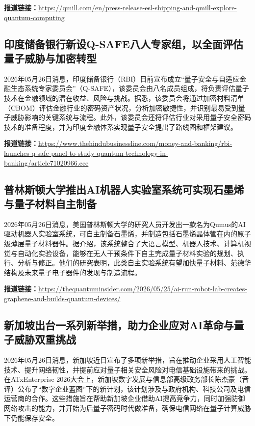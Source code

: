 \documentclass[12pt,a4paper]{ctexart}
\begin{document}
\noindent\textbf{报道链接：}\url{https://qmill.com/en/press-release-esl-shipping-and-qmill-explore-quantum-computing}

\subsection{ 印度储备银行新设Q-SAFE八人专家组，以全面评估量子威胁与加密转型 }

2026年05月26日消息，印度储备银行（RBI）日前宣布成立“量子安全与自适应金融生态系统专家委员会”（Q-SAFE），该委员会由八名成员组成，将负责评估量子技术在金融领域的潜在收益、风险与挑战。据悉，该委员会将通过加密材料清单（CBOM）评估金融行业的密码资产状况，分析加密敏捷性，并识别最易受到量子威胁影响的关键系统与流程。此外，该委员会还将评估行业对采用量子安全密码技术的准备程度，并为印度金融体系实现量子安全提出了路线图和框架建议。

\noindent\textbf{报道链接：}\url{https://www.thehindubusinessline.com/money-and-banking/rbi-launches-q-safe-panel-to-study-quantum-technology-in-banking/article71020966.ece}

\subsection{ 普林斯顿大学推出AI机器人实验室系统可实现石墨烯与量子材料自主制备 }

2026年05月26日消息，美国普林斯顿大学的研究人员开发出一款名为Qumus的AI驱动机器人实验室系统，可自主制备石墨烯，并制造包括石墨烯晶体管在内的原子级薄层量子材料器件。据介绍，该系统整合了大语言模型、机器人技术、计算机视觉与自动化实验设备，能够在无人干预条件下自主完成量子材料实验的规划、执行、分析与修正。他们的研究表明，此类自主实验系统有望加快量子材料、范德华结构及未来量子电子器件的发现与制造流程。

\noindent\textbf{报道链接：}\url{https://thequantuminsider.com/2026/05/25/ai-run-robot-lab-creates-graphene-and-builds-quantum-devices/}

\subsection{ 新加坡出台一系列新举措，助力企业应对AI革命与量子威胁双重挑战 }

2026年05月26日消息，新加坡近日宣布了多项新举措，旨在推动企业采用人工智能技术、提升网络韧性，并提前应对量子相关安全风险对电信基础设施带来的挑战。在ATxEnterprise 2026大会上，新加坡数字发展与信息部高级政务部长陈杰豪（音译）公布了“数字企业蓝图”下的新计划，该计划涉及与政府机构、科技公司及电信运营商的合作。这些措施旨在帮助新加坡企业借助AI提高竞争力，同时加强防御网络攻击的能力，并开始为后量子密码时代做准备，确保电信网络在量子计算威胁下仍能保存安全。
\end{document}
